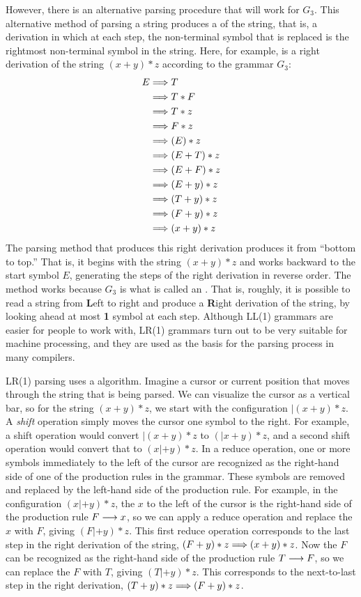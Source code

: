 However, there is an alternative parsing procedure that will work
for $G_3$.  This alternative method of parsing a string produces
a  of the string, that is, a derivation in
which at each step, the non-terminal symbol that is replaced is
the rightmost non-terminal symbol in the string.  Here, for example,
is a right derivation of the string $(x+y)*z$ according to the
grammar $G_3$:
\begin{align*}
  E &\Longrightarrow T\\
    &\Longrightarrow T*F\\
    &\Longrightarrow T*z\\
    &\Longrightarrow F*z\\
    &\Longrightarrow (E)*z\\
    &\Longrightarrow (E+T)*z\\
    &\Longrightarrow (E+F)*z\\
    &\Longrightarrow (E+y)*z\\
    &\Longrightarrow (T+y)*z\\
    &\Longrightarrow (F+y)*z\\
    &\Longrightarrow (x+y)*z
\end{align*}
The parsing method that produces this right derivation produces
it from ``bottom to top.''  That is, it begins with
the string $(x+y)*z$ and works backward to the start symbol $E$,
generating the steps of the right derivation in reverse order.
The method works because $G_3$ is what is called an
.  That is, roughly, it is possible to read
a string from \textbf{L}eft to right and produce a \textbf{R}ight
derivation of the string, by looking ahead at most \textbf{1} symbol at
each step.  Although LL(1) grammars are easier for people to work
with, LR(1) grammars turn out to be very suitable for machine
processing, and they are used as the basis for the parsing
process in many compilers.

LR(1) parsing uses a  algorithm.  Imagine a
cursor or current position that moves through the string that
is being parsed.  We can visualize the cursor as a vertical
bar, so for the string $(x+y)*z$, we start with the
configuration $|(x+y)*z$.  A \textit{shift} operation simply
moves the cursor one symbol to the right.  For example,
a shift operation would convert $|(x+y)*z$ to $(|x+y)*z$,
and a second shift operation would convert that to
$(x|+y)*z$.  In a reduce
operation, one or more symbols immediately to the left of
the cursor are recognized as the right-hand side of one of
the production rules in the grammar.  These symbols are removed
and replaced by the left-hand side of the production rule.
For example, in the configuration $(x|+y)*z$, the $x$ to the left
of the cursor is the right-hand side of the production rule
$F\longrightarrow x$, so we can apply a reduce operation and replace
the $x$ with $F$, giving $(F|+y)*z$.  This first reduce operation
corresponds to the last step in the right derivation of the
string, $(F+y)*z\Longrightarrow (x+y)*z$.  Now the $F$ can be recognized
as the right-hand side of the production rule $T\longrightarrow F$,
so we can replace the $F$ with $T$, giving $(T|+y)*z$.
This corresponds to the next-to-last step in the right
derivation, $(T+y)*z\Longrightarrow (F+y)*z$.


